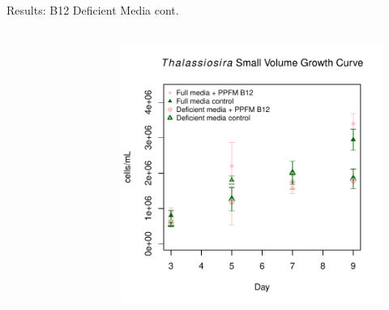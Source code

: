 \documentclass[8pt]{beamer}\usepackage[]{graphicx}\usepackage[]{color}
\begin{document}
\begin{frame}{Results: B12 Deficient Media cont.}
\begin{columns}
\begin{figure}
                        \end{figure}
                        \begin{figure}
                                \includegraphics[width=1\textwidth]{./figure/ExpM_GrowthCurve2_unlabeled}
                        \end{figure}
                                                \end{columns}

                        \end{frame}
                        
\end{document}
